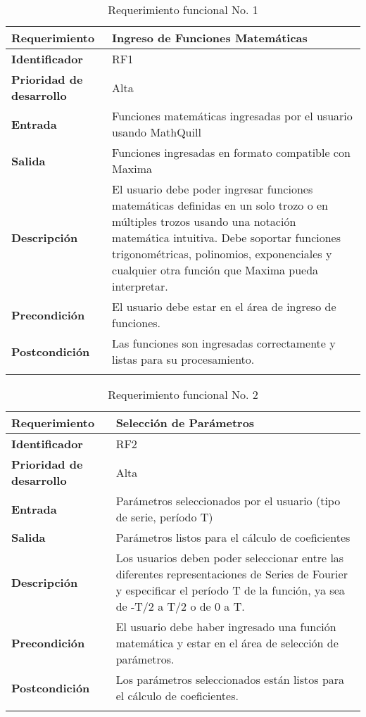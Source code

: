\begin{longtable}{|m{3.5cm}|m{9.5cm}|}
	\hline
	\rowcolor{black!75} \color{white}\textbf{Requerimiento} & \color{white}\textbf{Ingreso de Funciones Matemáticas} \\
	\hline
	
	\textbf{Identificador} & RF1 \\
	\hline
	\textbf{Prioridad de desarrollo} & Alta \\
	\hline
	\textbf{Entrada} & Funciones matemáticas ingresadas por el usuario usando MathQuill \\
	\hline
	\textbf{Salida} & Funciones ingresadas en formato compatible con Maxima \\
	\hline
	\textbf{Descripción} & El usuario debe poder ingresar funciones matemáticas definidas en un solo trozo o en múltiples trozos usando una notación matemática intuitiva. Debe soportar funciones trigonométricas, polinomios, exponenciales y cualquier otra función que Maxima pueda interpretar. \\
	\hline
	\textbf{Precondición} & El usuario debe estar en el área de ingreso de funciones. \\
	\hline
	\textbf{Postcondición} & Las funciones son ingresadas correctamente y listas para su procesamiento. \\
	\hline
	\rowcolor{white} \caption{Requerimiento funcional No. 1} \label{tabla:RF1} \\
\end{longtable}


\begin{longtable}{|m{3.5cm}|m{9.5cm}|}
	\hline
	\rowcolor{black!75} \color{white}\textbf{Requerimiento} & \color{white}\textbf{Selección de Parámetros} \\
	\hline
	\textbf{Identificador} & RF2 \\
	\hline
	\textbf{Prioridad de desarrollo} & Alta \\
	\hline
	\textbf{Entrada} & Parámetros seleccionados por el usuario (tipo de serie, período T) \\
	\hline
	\textbf{Salida} & Parámetros listos para el cálculo de coeficientes \\
	\hline
	\textbf{Descripción} & Los usuarios deben poder seleccionar entre las diferentes representaciones de Series de Fourier y especificar el período T de la función, ya sea de -T/2 a T/2 o de 0 a T. \\
	\hline
	\textbf{Precondición} & El usuario debe haber ingresado una función matemática y estar en el área de selección de parámetros. \\
	\hline
	\textbf{Postcondición} & Los parámetros seleccionados están listos para el cálculo de coeficientes. \\
	\hline
	\rowcolor{white} \caption{Requerimiento funcional No. 2} \label{tabla:RF2} \\
\end{longtable}


